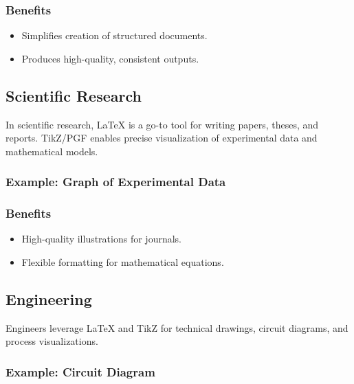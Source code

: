 \documentclass{article}
\begin{document}
\subsubsection*{Benefits}
\begin{itemize}
    \item Simplifies creation of structured documents.
    \item Produces high-quality, consistent outputs.
\end{itemize}

\subsection{Scientific Research}
In scientific research, LaTeX is a go-to tool for writing papers, theses, and reports. TikZ/PGF enables precise visualization of experimental data and mathematical models.

\subsubsection*{Example: Graph of Experimental Data}

\subsubsection*{Benefits}
\begin{itemize}
    \item High-quality illustrations for journals.
    \item Flexible formatting for mathematical equations.
\end{itemize}

\subsection{Engineering}
Engineers leverage LaTeX and TikZ for technical drawings, circuit diagrams, and process visualizations.

\subsubsection*{Example: Circuit Diagram}
\end{document}

